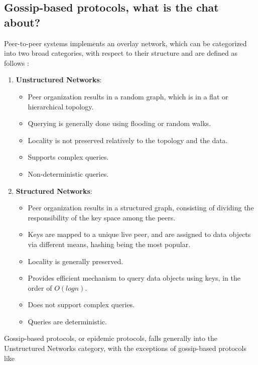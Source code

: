 \documentclass[11pt]{amsart}
\begin{document}
        \subsection{Gossip-based protocols, what is the chat about?}
        Peer-to-peer systems implements an overlay network, which can be categorized into
        two broad categories, with respect to their structure and are defined as follows
        \cite{lua2005survey}:
        \begin{enumerate}
          
          \item \textbf{Unstructured Networks}:
            \begin{itemize}
              \item Peer organization results in a random graph, which is in a flat or
                hierarchical topology.
              \item Querying is generally done using flooding or random walks.
              \item Locality is not preserved relatively to the topology and the data.
              \item Supports complex queries.
              \item Non-deterministic queries.
            \end{itemize}
          \item \textbf{Structured Networks}:
            \begin{itemize}
              \item Peer organization results in a structured graph, consisting of
                dividing the responsibility of the key space among the peers.
              \item Keys are mapped to a unique live peer, and are assigned to data
                objects via different means, hashing being the most popular.
              \item Locality is generally preserved.
              \item Provides efficient mechanism to query data objects using keys, in the
                order of $O(log n)$.
              \item Does not support complex queries.
              \item Queries are deterministic.
            \end{itemize}
        \end{enumerate}
        Gossip-based protocols, or epidemic protocols, falls generally into the
        Unstructured Networks category, with the exceptions of gossip-based protocols like
\end{document}

